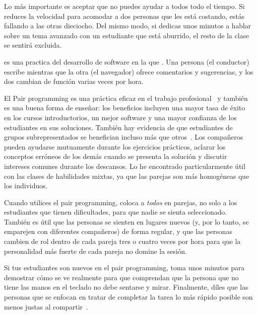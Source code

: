 Lo más importante es aceptar que
no puedes ayudar a todos todo el tiempo.
Si reduces la velocidad para acomodar a dos personas que les está costando,
estás fallando a las otras dieciocho.
Del mismo modo,
si dedicas unos minutos a hablar sobre un tema avanzado con un estudiante que está aburrido,
el resto de la clase se sentirá excluida.


 es una practica del desarrollo de software
en la que .
Una persona (el conductor) escribe
mientras que la otra (el navegador) ofrece comentarios y sugerencias,
y los dos cambian de función varias veces por hora.

El Pair programming es una práctica eficaz en el trabajo profesional~\cite{Hann2009}
y también es una buena forma de enseñar:
los beneficios incluyen una mayor tasa de éxito en los cursos introductorios,
un mejor software
y una mayor confianza de los estudiantes en sus soluciones.
También hay evidencia de que estudiantes de grupos subrepresentados
se benefician incluso más que otros~\cite{McDo2006,Hank2011,Port2013,Cele2018}.
Los compañeros pueden ayudarse mutuamente durante los ejercicios prácticos,
aclarar los conceptos erróneos de los demás cuando se presenta la solución
y discutir intereses comunes durante los descansos.
Lo he encontrado particularmente útil con las clases de habilidades mixtas,
ya que las parejas son más homogéneas que los individuos.

Cuando utilices el pair programming,
coloca a \emph{todos} en parejas,
no solo a los estudiantes que tienen dificultades,
para que nadie se sienta seleccionado.
También es útil que las personas se sienten en lugares nuevos
(y, por lo tanto, se emparejen con diferentes compañeros)
de forma regular,
y que las personas cambien de rol dentro de cada pareja tres o cuatro veces por hora
para que la personalidad más fuerte de cada pareja no domine la sesión.

Si tus estudiantes son nuevos en el pair programming,
toma unos minutos para demostrar cómo se ve realmente
para que comprendan que
la persona que no tiene las manos en el teclado
no debe sentarse y mirar.
Finalmente,
díles que las personas que se enfocan en tratar de completar la tarea lo más rápido posible
son menos justas al compartir~\cite{Lewi2015}.

